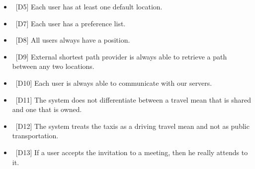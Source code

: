 \begin{description}
\begin{itemize}
\item~[D5] Each user has at least one default location.
\item~[D7] Each user has a preference list.
\item~[D8] All users always have a position.
\item~[D9] External shortest path provider is always able to retrieve a path between any two locations.
\item~[D10] Each user is always able to communicate with our servers.
\item~[D11] The system does not differentiate between a travel mean that is shared and one that is owned.
\item~[D12] The system treats the taxis as a driving travel mean and not as public transportation.
\item~[D13] If a user accepts the invitation to a meeting, then he really attends to it.
\end{itemize}
\end{description}
